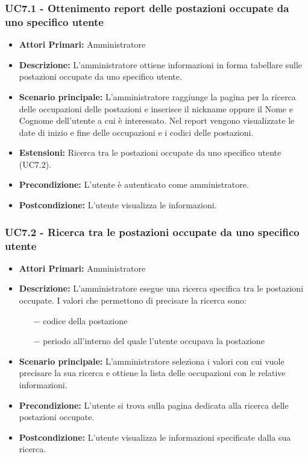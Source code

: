 \subsubsection{ UC7.1 - Ottenimento report delle postazioni occupate da uno specifico utente}
\begin{itemize}
           	\item\textbf{Attori Primari:} 
           	Amministratore
           	\item\textbf{Descrizione:} 
           	L'amministratore ottiene informazioni in forma tabellare sulle postazioni occupate da uno specifico utente.
           	\item\textbf{Scenario principale:} 
           	L'amministratore raggiunge la pagina per la ricerca delle occupazioni delle postazioni e inserisce il nickname oppure il Nome e Cognome dell'utente a cui è interessato.
           	Nel report vengono visualizzate le date di inizio e fine delle occupazioni e i codici delle postazioni.
           	\item\textbf{Estensioni:}
           	Ricerca tra le postazioni occupate da uno specifico utente (UC7.2).
           	\item\textbf{Precondizione:} 
           	L'utente è autenticato come amministratore.
           	\item\textbf{Postcondizione:}
           	L'utente visualizza le informazioni.
\end{itemize}


\subsubsection{ UC7.2 - Ricerca tra le postazioni occupate da uno specifico utente}
\begin{itemize}
	\item\textbf{Attori Primari:} 
	Amministratore
	\item\textbf{Descrizione:} 
	L'amministratore esegue una ricerca specifica tra le postazioni occupate.
	I valori che permettono di precisare la ricerca sono:
	\begin{itemize}
		\item[$-$] codice della postazione
		\item[$-$] periodo all'interno del quale l'utente occupava la postazione
	\end{itemize}
	\item\textbf{Scenario principale:} 
	L'amministratore seleziona i valori con cui vuole precisare la sua ricerca e ottiene la lista delle occupazioni con le relative informazioni.
	\item\textbf{Precondizione:} 
	L'utente si trova sulla pagina dedicata alla ricerca delle postazioni occupate.
	\item\textbf{Postcondizione:}
	L'utente visualizza le informazioni specificate dalla sua ricerca.
\end{itemize}


